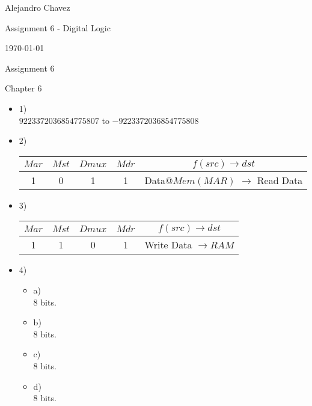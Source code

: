 \documentclass{article}
\begin{document}
\hfill Alejandro Chavez

\hfill Assignment 6 - Digital Logic

\hfill \today\\

\begin{center}\begin{large}Assignment 6\end{large}\end{center}	Chapter 6
\begin{itemize}
	\item
		1)\\
    $9223372036854775807$ to $-9223372036854775808$
	\item
		2)\\
    \begin{tabular}{cccc|c}
    $Mar$ & $Mst$ & $Dmux$ & $Mdr$ & $f(src)\to dst$ \\ \hline
     1    & 0     & 1     & 1      & Data@$Mem(MAR)$ $\to $ Read Data\\ 
    \end{tabular}
	\item
		3)\\
    \begin{tabular}{cccc|c}
    $Mar$ & $Mst$ & $Dmux$ & $Mdr$ & $f(src)\to dst$ \\ \hline
     1    &  1    & 0      & 1     & Write Data $\to RAM$ \\ 
    \end{tabular}
	\item
		4)
    \begin{itemize}
      \item
        a)\\
         8 bits.
      \item
        b)\\
        8 bits.
      \item
        c)\\
        8 bits.
      \item
        d)\\
        8 bits.
    \end{itemize}
\end{itemize}
\end{document}
